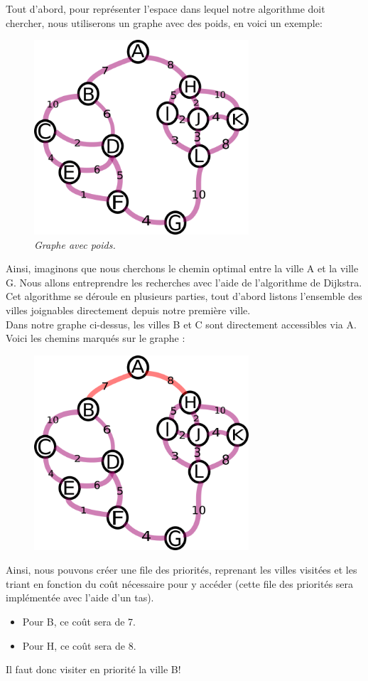 \documentclass[a4paper, 12pt]{article}
\numberwithin{equation}{subsection}
\begin{document}
Tout d'abord, pour représenter l'espace dans lequel notre algorithme doit chercher, nous utiliserons un graphe avec des poids, en voici un exemple: \\
\begin{figure}[H]
  \centering
  \includegraphics[width=8.0cm]{imgs/numbered_graph.png}
  \caption{{\em Graphe avec poids.}}
\end{figure}
Ainsi, imaginons que nous cherchons le chemin optimal entre la ville A et la ville G. Nous allons entreprendre les recherches avec l'aide de l'algorithme de Dijkstra. \\

Cet algorithme se déroule en plusieurs parties, tout d'abord listons l'ensemble des villes joignables directement depuis notre première ville. \\

Dans notre graphe ci-dessus, les villes B et C sont directement accessibles via A.\\

Voici les chemins marqués sur le graphe : \\
\begin{figure}[H]
  \centering
  \includegraphics[width=8.0cm]{imgs/second_search.png}
\end{figure}
Ainsi, nous pouvons créer une file des priorités, reprenant les villes visitées et les triant en fonction du coût nécessaire pour y accéder (cette file des priorités sera implémentée avec l'aide d'un tas). \\
\begin{itemize}
  \item Pour B, ce coût sera de 7.
  \item Pour H, ce coût sera de 8.
\end{itemize}
Il faut donc visiter en priorité la ville B! \\
\end{document}
